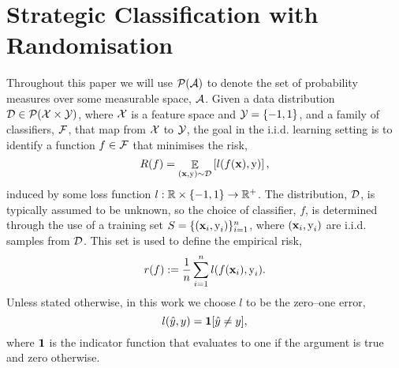 \section{Strategic Classification with Randomisation}
\label{sec:strategic_classification}
Throughout this paper we will use ${\mathcal{P}}({\mathcal{A}})$ to denote the set of probability measures over some measurable space, ${\mathcal{A}}$. Given a data distribution ${\mathcal{D}} \in {\mathcal{P}}({\mathcal{X}}\times {\mathcal{Y}})$, where ${\mathcal{X}}$ is a feature space and ${\mathcal{Y}} = \{-1,1\}$, and a family of classifiers, ${\mathcal{F}}$, that map from ${\mathcal{X}}$ to ${\mathcal{Y}}$, the goal in the i.i.d. learning setting is to identify a function $f \in {\mathcal{F}}$ that minimises the risk,
\begin{equation}
    R(f) = \mathop{\mathbb{E}}_{({\mathbf{x}}, {\textnormal{y}}) \sim {\mathcal{D}}}\left[l(f({\mathbf{x}}), {\textnormal{y}})\right],
    \label{eqn:risk}
\end{equation}
induced by some loss function $l: \mathbb{R} \times \{-1,1\} \rightarrow \mathbb{R}^+$. The distribution, ${\mathcal{D}}$, is typically assumed to be unknown, so the choice of classifier, $f$, is determined through the use of a training set $S = \{({\mathbf{x}}_{i}, {\textnormal{y}}_{i})\}_{i=1}^{n}$, where $({\mathbf{x}}_{i}, {\textnormal{y}}_{i})$ are i.i.d. samples from ${\mathcal{D}}$. This set is used to define the empirical risk,
\begin{equation}
    r(f) := \frac{1}{n}\sum_{i=1}^{n}l(f({\mathbf{x}}_{i}), {\textnormal{y}}_{i}).
    \label{eqn:empirical_risk}
\end{equation}
Unless stated otherwise, in this work we choose $l$ to be the zero--one error,
\begin{equation*}
    l(\hat{y}, y) = \mathbf{1}[\hat{y} \neq y],
\end{equation*}
where $\mathbf{1}$ is the indicator function that evaluates to one if the argument is true and zero otherwise.

